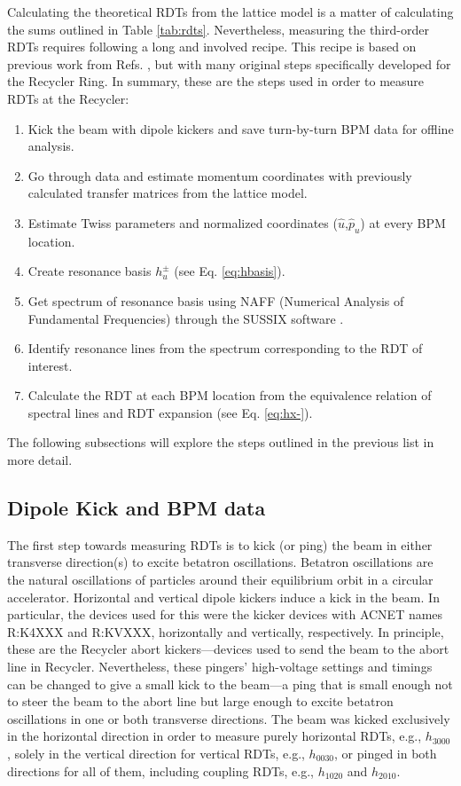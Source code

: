 Calculating the theoretical RDTs from the lattice model is a matter of calculating the sums outlined in Table \ref{tab:rdts}. Nevertheless, measuring the third-order RDTs requires following a long and involved recipe. This recipe is based on previous work from Refs. \cite{cernthesis2,bartolini}, but with many original steps specifically developed for the Recycler Ring. In summary, these are the steps used in order to measure RDTs at the Recycler:
\begin{enumerate}
    \item Kick the beam with dipole kickers and save turn-by-turn BPM data for offline analysis.
    \item Go through data and estimate momentum coordinates with previously calculated transfer matrices from the lattice model.
    \item Estimate Twiss parameters and normalized coordinates ($\hat{u}$,$\hat{p}_u$) at every BPM location.
    \item Create resonance basis $h_u^{\pm}$ (see Eq. \ref{eq:hbasis}).
    \item Get spectrum of resonance basis using NAFF (Numerical Analysis of Fundamental Frequencies) through the SUSSIX software \cite{sussix}.
    \item Identify resonance lines from the spectrum corresponding to the RDT of interest.
    \item Calculate the RDT at each BPM location from the equivalence relation of spectral lines and RDT expansion (see Eq. \ref{eq:hx-}). 
\end{enumerate}
The following subsections will explore the steps outlined in the previous list in more detail.

\subsection{Dipole Kick and BPM data}

The first step towards measuring RDTs is to kick (or ping) the beam in either transverse direction(s) to excite betatron oscillations. Betatron oscillations are the natural oscillations of particles around their equilibrium orbit in a circular accelerator. Horizontal and vertical dipole kickers induce a kick in the beam. In particular, the devices used for this were the kicker devices with ACNET names R:K4XXX and R:KVXXX, horizontally and vertically, respectively. In principle, these are the Recycler abort kickers---devices used to send the beam to the abort line in Recycler. Nevertheless, these pingers' high-voltage settings and timings can be changed to give a small kick to the beam---a ping that is small enough not to steer the beam to the abort line but large enough to excite betatron oscillations in one or both transverse directions. The beam was kicked exclusively in the horizontal direction in order to measure purely horizontal RDTs, e.g., $h_{3000}$, solely in the vertical direction for vertical RDTs, e.g., $h_{0030}$, or pinged in both directions for all of them, including coupling RDTs, e.g., $h_{1020}$ and $h_{2010}$.

